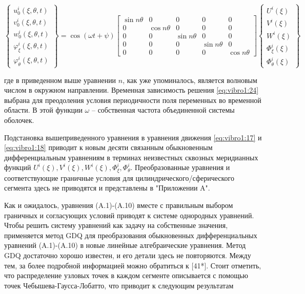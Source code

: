 \begin{equation}
	\label{eq:vibro1:24}
	\begin{Bmatrix}
		u_0^i(\xi, \theta, t) \\
		v_0^i(\xi, \theta, t) \\
		w_0^i(\xi, \theta, t) \\
		\varphi_{\xi}^i(\xi, \theta, t) \\
		\varphi_{\theta}^i(\xi, \theta, t)
	\end{Bmatrix} =
	\cos({\omega t + \psi})
\begin{bmatrix}
	\sin{n \theta} & 0 & 0 & 0 & 0 \\
	0 & \cos{n \theta} & 0 & 0 & 0 \\
	0 & 0 & \sin{n \theta} & 0 & 0 \\
	0 & 0 & 0 & \sin{n \theta} & 0 \\
	0 & 0 & 0 & 0 & \cos{n \theta}
\end{bmatrix}
	\begin{Bmatrix}
		U^i(\xi) \\
		V^i(\xi) \\
		W^i(\xi) \\
		\Phi_{\xi}^i(\xi) \\
		\Phi_{\theta}^i(\xi)
	\end{Bmatrix}
\end{equation}

где в приведенном выше уравнении \(n\), как уже упоминалось, является волновым числом в окружном направлении. Временная зависимость решения \cref{eq:vibro1:24} выбрана для преодоления условия периодичности поля переменных во временной области. В этой функции \(\omega\) -- собственная частота объединенной системы оболочек.


Подстановка вышеприведенного уравнения в уравнения движения \cref{eq:vibro1:17} и \cref{eq:vibro1:18} приводит к новым десяти связанным обыкновенным дифференциальным уравнениям в терминах неизвестных сквозных меридианных функций \(U^i(\xi), V^i(\xi), W^i (\xi), \Phi_{\xi}^i, \Phi_{\theta}^i\). Преобразованные уравнения и соответствующие граничные условия для цилиндрического/сферического сегмента здесь не приводятся и представлены в "Приложении A".

Как и ожидалось, уравнения (A.1)-(A.10) вместе с правильным выбором граничных и согласующих условий приводят к системе однородных уравнений. Чтобы решить систему уравнений как задачу на собственные значения, применяется метод GDQ для преобразования обыкновенных дифференциальных уравнений (A.1)-(A.10) в новые линейные алгебраические уравнения. Метод GDQ достаточно хорошо известен, и его детали здесь не повторяются. Между тем, за более подробной информацией можно обратиться к [41*]. Стоит отметить, что распределение узловых точек в каждом сегменте описывается с помощью точек Чебышева-Гаусса-Лобатто, что приводит к следующим результатам

